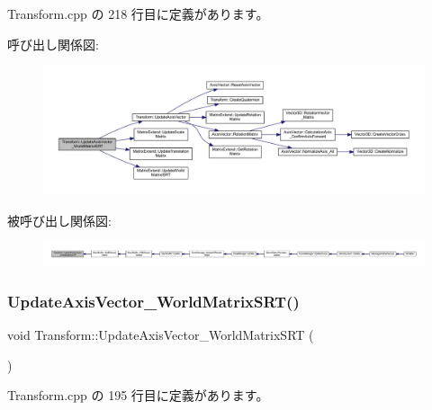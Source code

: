  Transform.\+cpp の 218 行目に定義があります。

呼び出し関係図\+:\nopagebreak
\begin{figure}[H]
\begin{center}
\leavevmode
\includegraphics[width=350pt]{class_transform_a73a20f2b8baad21ba74a2b1c6d8a1ab2_cgraph}
\end{center}
\end{figure}
被呼び出し関係図\+:
\nopagebreak
\begin{figure}[H]
\begin{center}
\leavevmode
\includegraphics[width=350pt]{class_transform_a73a20f2b8baad21ba74a2b1c6d8a1ab2_icgraph}
\end{center}
\end{figure}
\mbox{\label{class_transform_af02515be1947506212ca1c23223ce0b3}} 
\subsubsection{\texorpdfstring{Update\+Axis\+Vector\+\_\+\+World\+Matrix\+S\+R\+T()}{UpdateAxisVector\_WorldMatrixSRT()}}
{\footnotesize\ttfamily void Transform\+::\+Update\+Axis\+Vector\+\_\+\+World\+Matrix\+S\+RT (\begin{DoxyParamCaption}{ }\end{DoxyParamCaption})}



 Transform.\+cpp の 195 行目に定義があります。

